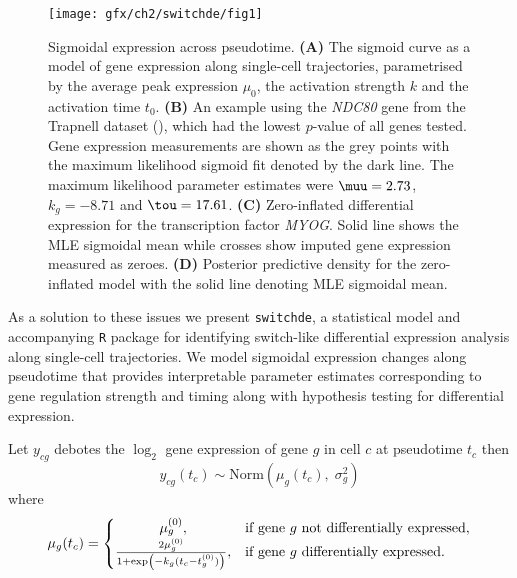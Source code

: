 \begin{figure}[!h]
\centering
\texttt{[image: gfx/ch2/switchde/fig1]}
\caption{Sigmoidal expression across pseudotime.
\textbf{(A)} The sigmoid curve as a model of gene expression along single-cell trajectories, parametrised by the average peak expression $\mu_0$, the activation strength $k$ and the activation time $t_0$.
\textbf{(B)} An example using the \emph{NDC80} gene from the Trapnell dataset (\cite{trapnell2014dynamics}), which had the lowest $p$-value of all genes tested. Gene expression measurements are shown as the grey points with the maximum likelihood sigmoid fit denoted by the dark line. The maximum likelihood parameter estimates were $\muu = 2.73$, $k_g = -8.71$ and $\tou = 17.61$.
\textbf{(C)} Zero-inflated differential expression for the transcription factor \emph{MYOG}. Solid line shows the MLE sigmoidal mean while  crosses show imputed gene expression measured as zeroes.
\textbf{(D)} Posterior predictive density for the zero-inflated model with the solid line denoting MLE sigmoidal mean.
}\label{fig:01}
\end{figure}


As a solution to these issues we present \texttt{switchde}, a statistical model and accompanying \texttt{R} package for identifying switch-like differential expression analysis along single-cell trajectories. We model sigmoidal expression changes along pseudotime that provides interpretable parameter estimates corresponding to gene regulation strength and timing along with hypothesis testing for differential expression.



Let $y_{cg}$ debotes the $\log_2$ gene expression of gene $g$ in cell $c$ at pseudotime $t_c$ then
\begin{equation} \label{eq:nzi}
y_{cg}(t_c) \sim \mathrm{Norm}(\mu_g(t_c), \; \sigma_g^2)
\end{equation}
where
\begin{equation}
    \mu_g(t_c) =
\begin{cases}
    \hfil  \mu^{(0)}_g, & \text{if } \text{gene $g$ not differentially expressed},  \\
    \frac{2 \mu^{(0)}_g}{1 + \exp\left(-k_g(t_c - t^{(0)}_g)\right)}, &  \text{if gene $g$ differentially expressed}.
\end{cases}
\end{equation}


